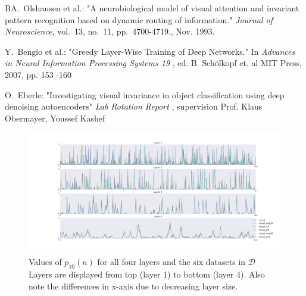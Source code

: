 \documentclass[10pt,a4paper]{article}
\begin{document}
 \begin{thebibliography}{5}

	BA.~Olshausen et al.: "A neurobiological model of visual attention and invariant pattern recognition based on dynamic routing of information." {\em  Journal of Neuroscience},
	vol.~13, no.~11, pp.~4700-4719., Nov. 1993.

	Y.~Bengio et al.: "Greedy Layer-Wise Training of Deep Networks." In {\em Advances in Neural Information Processing Systems 19 }, ed. B. Schölkopf et. al MIT Press, 2007, pp. 153 -160

	O.~Eberle: "Investigating visual invariance in object classification using deep denoising autoencoders" {\em Lab Rotation Report }, supervision Prof. Klaus Obermayer, Youssef Kashef
 
\end{thebibliography}
%
%
%
\begin{flushleft}
\begin{figure}[h]
\includegraphics[angle=90,origin=c, scale = .35]{most_active_neurons_6datasets.png}
\caption{\footnotesize{Values of $p_{10}(n)$ for all four layers and the six datasets in $\mathcal{D}$ Layers are displayed from top (layer 1) to bottom (layer 4). Also note the differences in x-axis due to decreasing layer size.}}
\label{fig:MostActive_all}
\end{figure}
\end{flushleft}





\end{document}
